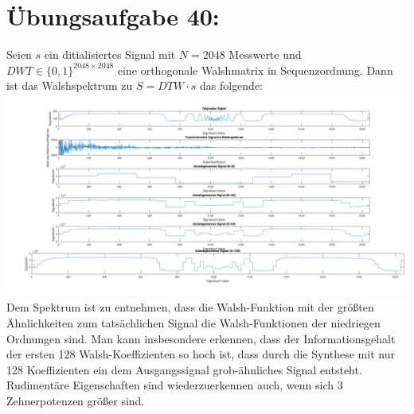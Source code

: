 

	\section*{Übungsaufgabe 40:}
		Seien $s$ ein ditialisiertes Signal mit $N= 2048$ Messwerte und $DWT \in\{0,1\}^{2048\times 2048}$ eine orthogonale Walshmatrix in Sequenzordnung. Dann ist das Walshspektrum zu $S = DTW\cdot s$ das folgende:\\
		\includegraphics[width = \textwidth]{A40.png}\\
		Dem Spektrum ist zu entnehmen, dass die Walsh-Funktion mit der größten Ähnlichkeiten zum tatsächlichen Signal die Walsh-Funktionen der niedriegen Ordnungen sind. Man kann insbesondere erkennen, dass der Informationsgehalt der ersten 128 Walsh-Koeffizienten so hoch ist, dass durch die Synthese mit nur 128 Koeffizienten ein dem Ausgangssignal grob-ähnliches Signal entsteht. Rudimentäre Eigenschaften sind wiederzuerkennen auch, wenn sich 3 Zehnerpotenzen größer sind.
	
\newpage
